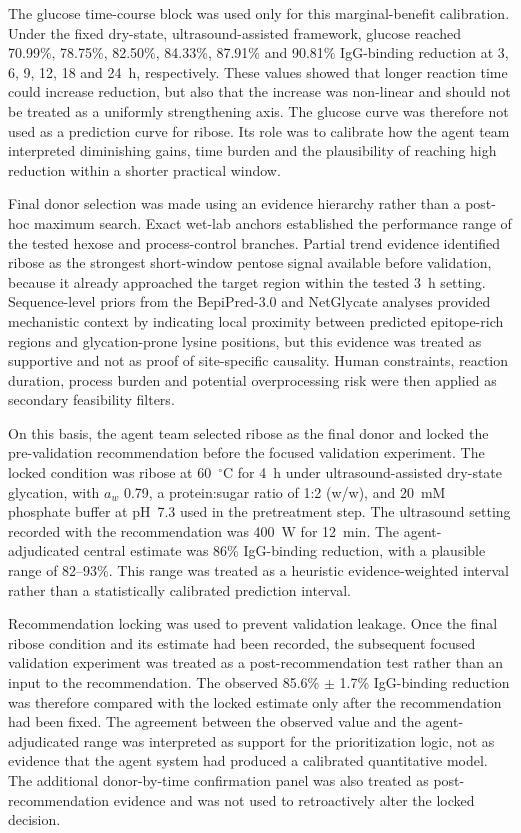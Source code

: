 The glucose time-course block was used only for this marginal-benefit calibration.
Under the fixed dry-state, ultrasound-assisted framework, glucose reached
70.99\%, 78.75\%, 82.50\%, 84.33\%, 87.91\% and 90.81\% IgG-binding reduction at
3, 6, 9, 12, 18 and 24~h, respectively. These values showed that longer reaction
time could increase reduction, but also that the increase was non-linear and
should not be treated as a uniformly strengthening axis. The glucose curve was
therefore not used as a prediction curve for ribose. Its role was to calibrate
how the agent team interpreted diminishing gains, time burden and the plausibility
of reaching high reduction within a shorter practical window.

Final donor selection was made using an evidence hierarchy rather than a
post-hoc maximum search. Exact wet-lab anchors established the performance range
of the tested hexose and process-control branches. Partial trend evidence
identified ribose as the strongest short-window pentose signal available before
validation, because it already approached the target region within the tested
3~h setting. Sequence-level priors from the BepiPred-3.0 and NetGlycate analyses
provided mechanistic context by indicating local proximity between predicted
epitope-rich regions and glycation-prone lysine positions, but this evidence was
treated as supportive and not as proof of site-specific causality. Human
constraints, reaction duration, process burden and potential overprocessing risk
were then applied as secondary feasibility filters.

On this basis, the agent team selected ribose as the final donor and locked the
pre-validation recommendation before the focused validation experiment. The locked
condition was ribose at 60~$^\circ$C for 4~h under ultrasound-assisted dry-state
glycation, with $a_w$ 0.79, a protein:sugar ratio of 1:2 (w/w), and 20~mM
phosphate buffer at pH~7.3 used in the pretreatment step. The ultrasound setting
recorded with the recommendation was 400~W for 12~min. The agent-adjudicated
central estimate was 86\% IgG-binding reduction, with a plausible range of
82--93\%. This range was treated as a heuristic evidence-weighted interval rather
than a statistically calibrated prediction interval.

Recommendation locking was used to prevent validation leakage. Once the final
ribose condition and its estimate had been recorded, the subsequent focused
validation experiment was treated as a post-recommendation test rather than an
input to the recommendation. The observed 85.6\% $\pm$ 1.7\% IgG-binding
reduction was therefore compared with the locked estimate only after the
recommendation had been fixed. The agreement between the observed value and the
agent-adjudicated range was interpreted as support for the prioritization logic,
not as evidence that the agent system had produced a calibrated quantitative
model. The additional donor-by-time confirmation panel was also treated as
post-recommendation evidence and was not used to retroactively alter the locked
decision.

